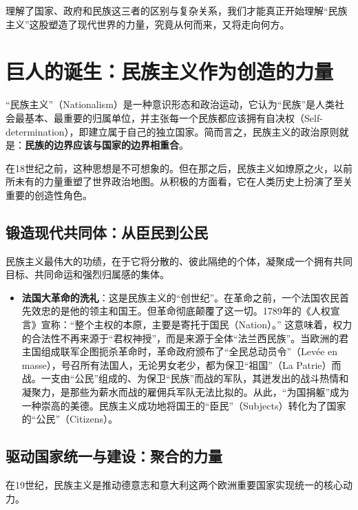 理解了国家、政府和民族这三者的区别与复杂关系，我们才能真正开始理解“民族主义”这股塑造了现代世界的力量，究竟从何而来，又将走向何方。

\hrulefill

\section{巨人的诞生：民族主义作为创造的力量}

“民族主义”（Nationalism）是一种意识形态和政治运动，它认为“民族”是人类社会最基本、最重要的归属单位，并主张每一个民族都应该拥有自决权（Self-determination），即建立属于自己的独立国家。简而言之，民族主义的政治原则就是：\textbf{民族的边界应该与国家的边界相重合}。

在18世纪之前，这种思想是不可想象的。但在那之后，民族主义如燎原之火，以前所未有的力量重塑了世界政治地图。从积极的方面看，它在人类历史上扮演了至关重要的创造性角色。

\subsection{锻造现代共同体：从臣民到公民}

民族主义最伟大的功绩，在于它将分散的、彼此隔绝的个体，凝聚成一个拥有共同目标、共同命运和强烈归属感的集体。

\begin{itemize}[noitemsep,topsep=0pt]
    \item \textbf{法国大革命的洗礼}：这是民族主义的“创世纪”。在革命之前，一个法国农民首先效忠的是他的领主和国王。但革命彻底颠覆了这一切。1789年的《人权宣言》宣称：“整个主权的本原，主要是寄托于国民（Nation）。” 这意味着，权力的合法性不再来源于“君权神授”，而是来源于全体“法兰西民族”。当欧洲的君主国组成联军企图扼杀革命时，革命政府颁布了“全民总动员令”（Levée en masse），号召所有法国人，无论男女老少，都为保卫“祖国”（La Patrie）而战。一支由“公民”组成的、为保卫“民族”而战的军队，其迸发出的战斗热情和凝聚力，是那些为薪水而战的雇佣兵军队无法比拟的。从此，“为国捐躯”成为一种崇高的美德。民族主义成功地将国王的“臣民”（Subjects）转化为了国家的“公民”（Citizens）。
\end{itemize}

\subsection{驱动国家统一与建设：聚合的力量}

在19世纪，民族主义是推动德意志和意大利这两个欧洲重要国家实现统一的核心动力。

